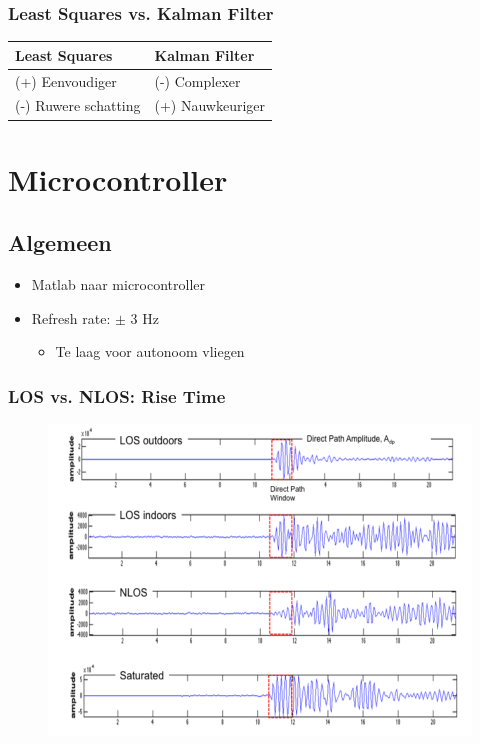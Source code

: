 \documentclass{beamer}
\begin{document}
  \begin{frame}
    \frametitle{Least Squares vs. Kalman Filter}
    \begin{center}
    \begin{tabular}{|l|l|}
      \hline
      Least Squares & Kalman Filter \\
      \hline
      (+) Eenvoudiger & (-) Complexer \\
      (-) Ruwere schatting & (+) Nauwkeuriger \\
      \hline
    \end{tabular}
    \end{center}
  \end{frame}


\section{Microcontroller}
\subsection{Algemeen}
\begin{frame}
\begin{itemize}
\frametitle{Algemeen}
\item Matlab naar microcontroller
\item Refresh rate: $\pm$ 3 Hz
\begin{itemize}
\item Te laag voor autonoom vliegen
\end{itemize}
\end{itemize}
\end{frame}
\begin{frame}
\frametitle{LOS vs. NLOS: Rise Time}
 \begin{figure}
      \begin{center}
        \includegraphics[width=0.7\linewidth]{images/NLOS.png}
      \end{center}
    \end{figure}
\end{frame}
\end{document}
